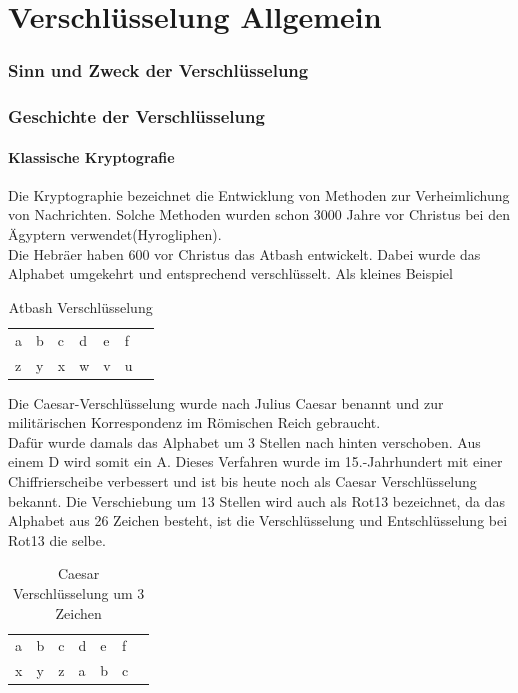 \part{Verschlüsselung Allgemein}
\section{Sinn und Zweck der Verschlüsselung}


\section{Geschichte der Verschlüsselung}
\subsection{Klassische Kryptografie}
Die Kryptographie bezeichnet die Entwicklung von Methoden zur Verheimlichung von Nachrichten.
Solche Methoden wurden schon 3000 Jahre vor Christus bei den Ägyptern verwendet(Hyrogliphen). \\
Die Hebräer haben 600 vor Christus das Atbash entwickelt. Dabei wurde das Alphabet umgekehrt und entsprechend verschlüsselt.
Als kleines Beispiel

\begin{table}[ht]
\caption{Atbash Verschlüsselung}
\begin{center}
\begin{tabular}{|l|l|l|l|l|l|l|}
  a & b & c & d & e & f\\
  z & y & x & w & v & u\\
\end{tabular}
\end{center}
\end{table}


Die Caesar-Verschlüsselung wurde nach Julius Caesar benannt und zur militärischen Korrespondenz im Römischen Reich gebraucht.\\
Dafür wurde damals das Alphabet um 3 Stellen nach hinten verschoben. Aus einem D wird somit ein A. Dieses Verfahren wurde im 15.-Jahrhundert mit einer
Chiffrierscheibe verbessert und ist bis heute noch als Caesar Verschlüsselung bekannt. Die Verschiebung um 13 Stellen wird auch als Rot13 bezeichnet, 
da das Alphabet aus 26 Zeichen besteht, ist die Verschlüsselung und Entschlüsselung bei Rot13 die selbe.

\begin{table}[ht]
\caption{Caesar Verschlüsselung um 3 Zeichen}
\begin{center}
\begin{tabular}{|l|l|l|l|l|l|l|}
  a & b & c & d & e & f\\
  x & y & z & a & b & c\\
\end{tabular}
\end{center}
\end{table}

